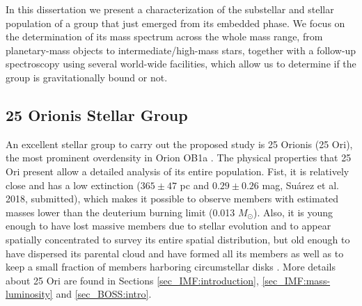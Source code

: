 \documentclass[12pt]{article}
\begin{document}

In this dissertation we present a characterization of the substellar and stellar population of a group that just emerged from its embedded phase. We focus on the determination of its mass spectrum across the whole mass range, from planetary-mass objects to intermediate/high-mass stars, together with a follow-up spectroscopy using several world-wide facilities, which allow us to determine if the group is gravitationally bound or not.

\subsection{25 Orionis Stellar Group}
An excellent stellar group to carry out the proposed study is 25 Orionis (\ac{25 Ori}), the most prominent overdensity in Orion OB1a \citep{Briceno2005,Downes2014,Briceno2018}. The physical properties that 25 Ori present allow a detailed analysis of its entire population. Fist, it is relatively close and has a low extinction ($365\pm47$ pc and $0.29\pm0.26$ mag, Su\'arez et al. 2018, submitted), which makes it possible to observe members with estimated masses lower than the deuterium burning limit (0.013 $M_\odot$). Also, it is young enough \citep[6.1$\pm$2.4; ][]{Briceno2018} to have lost massive members due to stellar evolution and to appear spatially concentrated to survey its entire spatial distribution, but old enough to have dispersed its parental cloud and have formed all its members as well as to keep a small fraction of members harboring circumstellar disks \citep{Briceno2005,Hernandez2007a,Downes2014}. More details about 25 Ori are found in Sections \ref{sec_IMF:introduction}, \ref{sec_IMF:mass-luminosity} and \ref{sec_BOSS:intro}.
\end{document}
